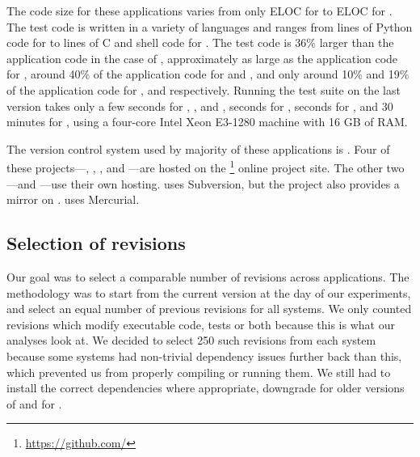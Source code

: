 The code size for these applications varies from only \memcachedSize ELOC for
\memcached to \gitSize ELOC for \git.  The test code is written in a variety of
languages and ranges from \lighttpdtwoTsize lines of Python code for
\lighttpdtwo to \gitTsize lines of C and shell code for \git.  The test code is
36\% larger than the application code in the case of \git, approximately as
large as the application code for \memcached, around 40\% of the application
code for \redis and \zeromq, and only around 10\% and 19\% of the application
code for \lighttpdtwo, \vim and \binutils respectively.  Running the test suite
on the last version takes only a few seconds for \binutils, \lighttpdtwo, \vim
and \zeromq, \memcachedTestTime seconds for \memcached, \redisTestTime seconds
for \redis, and 30 minutes for \git, using a four-core Intel Xeon E3-1280
machine with 16 GB of RAM.

The version control system used by majority of these applications is \git.
Four of these projects---\git, \memcached, \redis, and \zeromq ---are hosted on
the \github\footnote{\url{https://github.com/}} online project site.  The other
two---\binutils and \lighttpdtwo---use their own \git hosting. \lighttpd uses
Subversion, but the project also provides a \git mirror on \github. \vim uses
Mercurial.

\subsection{Selection of revisions}

Our goal was to select a comparable number of revisions across applications.
The methodology was to start from the current version at the day of our
experiments, and select an equal number of previous revisions for all systems.
We only counted revisions which modify executable code, tests or both because
this is what our analyses look at. We decided to select 250 such revisions from
each system because some systems had non-trivial dependency issues further back
than this, which prevented us from properly compiling or running them.  We
still had to install the correct dependencies where appropriate, \eg downgrade
 for older versions of \lighttpdtwo and  for
\memcached.


